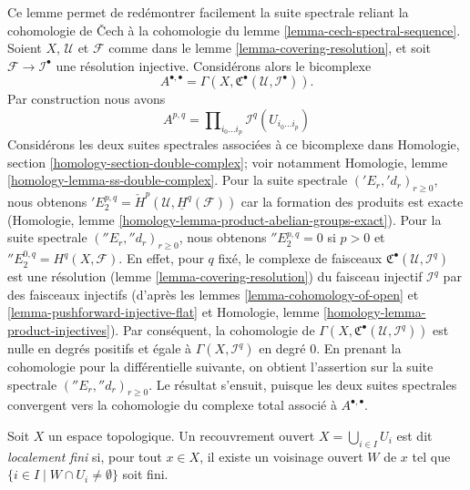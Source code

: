 Ce lemme permet de redémontrer facilement la suite spectrale reliant la cohomologie de {\v C}ech à la cohomologie du lemme \ref{lemma-cech-spectral-sequence}. Soient $X$, $\mathcal{U}$ et $\mathcal{F}$ comme dans le lemme \ref{lemma-covering-resolution},
et soit $\mathcal{F} \to \mathcal{I}^\bullet$ une résolution injective. Considérons alors le bicomplexe
$$
A^{\bullet, \bullet} =
\Gamma(X, {\mathfrak C}^\bullet(\mathcal{U}, \mathcal{I}^\bullet)).
$$
Par construction nous avons
$$
A^{p, q} = \prod\nolimits_{i_0 \ldots i_p} \mathcal{I}^q(U_{i_0 \ldots i_p})
$$
Considérons les deux suites spectrales associées à ce bicomplexe dans Homologie, section \ref{homology-section-double-complex}; voir notamment Homologie, lemme \ref{homology-lemma-ss-double-complex}. Pour la suite spectrale $({}'E_r, {}'d_r)_{r \geq 0}$, nous obtenons
${}'E_2^{p, q} = \check{H}^p(\mathcal{U}, \underline{H}^q(\mathcal{F}))$
car la formation des produits est exacte (Homologie, lemme \ref{homology-lemma-product-abelian-groups-exact}). Pour la suite spectrale $({}''E_r, {}''d_r)_{r \geq 0}$, nous obtenons
${}''E_2^{p, q} = 0$ si $p > 0$ et ${}''E_2^{0, q} = H^q(X, \mathcal{F})$. En effet, pour $q$ fixé, le complexe de faisceaux
${\mathfrak C}^\bullet(\mathcal{U}, \mathcal{I}^q)$
est une résolution (lemme \ref{lemma-covering-resolution}) du faisceau injectif $\mathcal{I}^q$
par des faisceaux injectifs (d'après les lemmes \ref{lemma-cohomology-of-open} et
\ref{lemma-pushforward-injective-flat}
et Homologie, lemme \ref{homology-lemma-product-injectives}). Par conséquent, la cohomologie de
$\Gamma(X, {\mathfrak C}^\bullet(\mathcal{U}, \mathcal{I}^q))$
est nulle en degrés positifs et égale à $\Gamma(X, \mathcal{I}^q)$
en degré $0$. En prenant la cohomologie pour la différentielle suivante, on obtient l'assertion sur la suite spectrale $({}''E_r, {}''d_r)_{r \geq 0}$. Le résultat s'ensuit, puisque les deux suites spectrales convergent vers la cohomologie du complexe total associé à $A^{\bullet, \bullet}$.

\begin{definition}

\label{definition-covering-locally-finite}

Soit $X$ un espace topologique. Un recouvrement ouvert $X = \bigcup_{i \in I} U_i$ est dit
{\it localement fini} si, pour tout $x \in X$, il existe un voisinage ouvert
$W$ de $x$ tel que $\{i \in I \mid W \cap U_i \not = \emptyset\}$ soit fini.

\end{definition}

